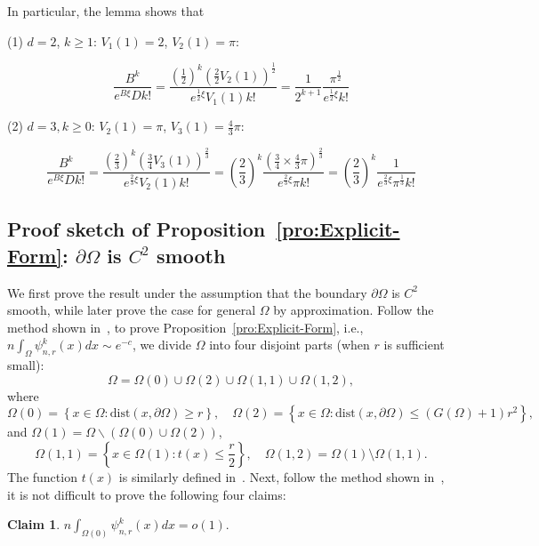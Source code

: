\documentclass[preprint,12pt]{elsarticle}
\newtheorem{claim}{Claim}
\begin{document}
In particular, the lemma shows that

(1) $d = 2$, $k\geq 1$:  $V_1(1)=2$, $V_2(1)=\pi$:

$$
\frac{B^k}{e^{B\xi}Dk!} = \frac{\left(\frac{1}{2}\right)^k\left(\frac{2}{2}V_2(1)\right)^{\frac{1}{2}}}{e^{\frac{1}{2}\xi}{V_{1}(1)}k!} = \frac{1}{2^{k+1}} \frac{\pi^{\frac{1}{2}}}{ e^{\frac{1}{2}\xi} k!}
$$

(2) $d = 3, k\geq 0$: $V_2(1)=\pi$, $V_3(1)=\frac{4}{3}\pi$:

$$
\frac{B^k}{e^{B\xi}Dk!} = \frac{\left(\frac{2}{3}\right)^k\left(\frac{3}{4}V_3(1)\right)^{\frac{2}{3}}}{e^{\frac{2}{3}\xi}{V_{2}(1)}k!} = \left(\frac{2}{3}\right)^k\frac{\left(\frac{3}{4}\times \frac{4}{3}\pi\right)^{\frac{2}{3}}}{e^{\frac{2}{3}\xi}\pi k!} = \left(\frac{2}{3}\right)^k \frac{1}{e^{\frac{2}{3}\xi}\pi^{\frac{1}{3}}k!}
$$




\subsection{Proof sketch of Proposition~\ref{pro:Explicit-Form}: $\partial\Omega$ is $C^2$ smooth}

We first prove the result under the assumption that the boundary $\partial \Omega$ is $C^2$ smooth, while later prove the case for general $\Omega$ by approximation. Follow the method shown in~\cite{Ding-RGG2018, Ding-RGG2025, Ding2022-3DRadii},  to prove Proposition~\ref{pro:Explicit-Form}, i.e., $ n\int_{\Omega} \psi^k_{n,r}(x)dx\sim e^{-c}$, we divide $\Omega$ into four disjoint parts (when $r$ is sufficient small):
$$
    \Omega=\Omega(0)\cup \Omega(2) \cup \Omega(1,1) \cup \Omega(1,2),
$$
where
$$
     \Omega(0)=\left\{x\in\Omega:\mathrm{dist}(x,\partial\Omega)\geq r\right\}, \quad
     \Omega(2)=\left\{x\in\Omega:\mathrm{dist}(x,\partial\Omega)\leq
     (G(\Omega)+1)r^2\right\},
$$
and $\Omega(1)= \Omega\backslash (\Omega(0)\cup \Omega(2))$,
$$
    \Omega(1,1)=\left\{x\in \Omega(1):t(x)\leq \frac r2\right\}, \quad
   \Omega(1,2)=\Omega(1)\setminus\Omega(1,1).
$$
The function $t(x)$ is similarly defined in~\cite{Ding-RGG2018, Ding-RGG2025, Ding2022-3DRadii}.
Next, follow the method shown in~\cite{Ding-RGG2018, Ding-RGG2025, Ding2022-3DRadii}, it is not difficult to prove the following four claims:


\begin{claim}\label{pro:Omega(0)}
 $n\int_{\Omega(0)} \psi^k_{n,r}(x)dx= o\left(1\right). $
\end{claim}
\end{document}
